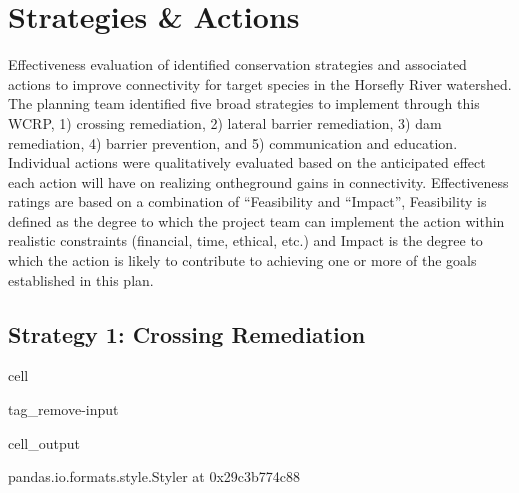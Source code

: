 \documentclass[letterpaper,10pt,english]{jupyterBook}
\begin{document}
\chapter{Strategies \& Actions}
\label{\detokenize{EcoAttributes:strategies-actions}}
\sphinxAtStartPar
Effectiveness evaluation of identified conservation strategies and associated actions to improve connectivity for target species in the Horsefly River watershed. The planning team identified five broad strategies to implement through this WCRP, 1) crossing remediation, 2) lateral barrier remediation, 3) dam remediation, 4) barrier prevention, and 5) communication and education. Individual actions were qualitatively evaluated based on the anticipated effect each action will have on realizing on\sphinxhyphen{}the\sphinxhyphen{}ground gains in connectivity. Effectiveness ratings are based on a combination of “Feasibility and “Impact”, Feasibility is defined as the degree to which the project team can implement the action within realistic constraints (financial, time, ethical, etc.) and Impact is the degree to which the action is likely to contribute to achieving one or more of the goals established in this plan.


\section{Strategy 1: Crossing Remediation}
\label{\detokenize{EcoAttributes:strategy-1-crossing-remediation}}
\begin{sphinxuseclass}{cell}
\begin{sphinxuseclass}{tag_remove-input}\begin{sphinxVerbatimOutput}

\begin{sphinxuseclass}{cell_output}
\begin{sphinxVerbatim}[commandchars=\\\{\}]
\PYGZlt{}pandas.io.formats.style.Styler at 0x29c3b774c88\PYGZgt{}
\end{sphinxVerbatim}

\end{sphinxuseclass}\end{sphinxVerbatimOutput}

\end{sphinxuseclass}
\end{sphinxuseclass}
\end{document}
